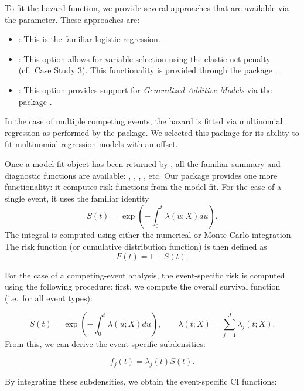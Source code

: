 To fit the hazard function, we provide several approaches that are
available via the  parameter. These approaches are:

\begin{itemize}
\tightlist
\item
  : This is the familiar logistic regression.
\item
  : This option allows for variable selection using the
  elastic-net \citep{zou2005regularization} penalty (cf.~Case Study 3).
  This functionality is provided through the  package
  \citep{friedman2010jss}.
\item
  : This option provides support for \emph{Generalized
  Additive Models} via the  package
  \citep{hastie1987generalized}.
\end{itemize}

In the case of multiple competing events, the hazard is fitted via
multinomial regression as performed by the  package. We
selected this package for its ability to fit multinomial regression
models with an offset.

Once a model-fit object has been returned by , all
the familiar summary and diagnostic functions are available:
, , , , etc. Our
package provides one more functionality: it computes risk functions from
the model fit. For the case of a single event, it uses the familiar
identity \begin{equation}\label{eqn:surv}
S(t) = \exp\left(-\int_0^t \lambda(u;X) du\right).
\end{equation} The integral is computed using either the numerical or
Monte-Carlo integration. The risk function (or cumulative distribution
function) is then defined as \begin{equation}\label{eqn:CDF}
F(t) = 1 - S(t).
\end{equation}

For the case of a competing-event analysis, the event-specific risk is
computed using the following procedure: first, we compute the overall
survival function (i.e.~for all event types):

\[ S(t) = \exp\left(-\int_0^t \lambda(u;X) du\right),\qquad \lambda(t;X) = \sum_{j=1}^J \lambda_j(t;X).\]
From this, we can derive the event-specific subdensities:

\[ f_j(t) = \lambda_j(t)S(t).\]

By integrating these subdensities, we obtain the event-specific CI
functions:


